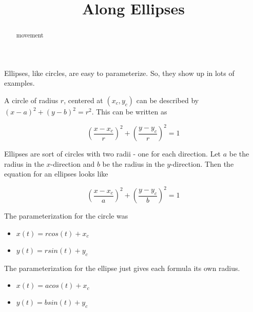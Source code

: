 \documentclass{ximera}
\title{Along Ellipses}
\begin{document}
\begin{abstract}
movement
\end{abstract}
\maketitle



Ellipses, like circles, are easy to parameterize.  So, they show up in lots of examples.



A circle of radius $r$, centered at $(x_c, y_c)$ can be described by $(x-a)^2+(y-b)^2=r^2$.  This can be written as 



\[          \left(\frac{x-x_c}{r}\right)^2+\left(\frac{y-y_c}{r}\right)^2 = 1 \]

Ellipses are sort of circles with two radii - one for each direction. Let $a$ be the radius in the $x$-direction and $b$ be the radius in the $y$-direction.  Then the equation for an ellipses looks like 



\[          \left(\frac{x-x_c}{a}\right)^2+\left(\frac{y-y_c}{b}\right)^2 = 1 \]







The parameterization for the circle was

\begin{itemize}
\item $x(t) = r cos(t) + x_c$
\item $y(t) = r sin(t) + y_c$
\end{itemize}









The parameterization for the ellipse just gives each formula its own radius.

\begin{itemize}
\item $x(t) = a cos(t) + x_c$
\item $y(t) = b sin(t) + y_c$
\end{itemize}







\begin{center}
\end{center}
\end{document}
